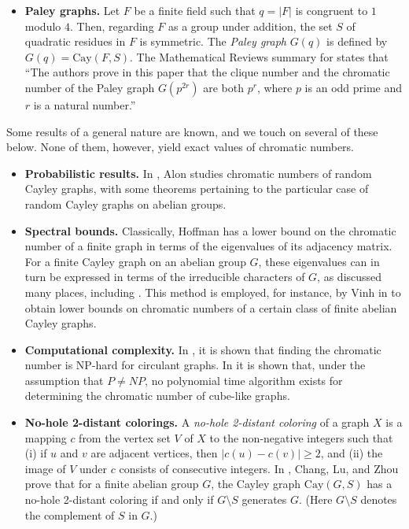 \documentclass{article}
\theoremstyle{definition}
\theoremstyle{remark}
\begin{document}
\begin{itemize}
\item \textbf{Paley graphs.} Let $F$ be a finite field such that $q=|F|$ is congruent to $1$ modulo $4$.  Then, regarding $F$ as a group under addition, the set $S$ of quadratic residues in $F$ is symmetric.  The \emph{Paley graph} $G(q)$ is defined by $G(q)=\text{Cay}(F,S)$.  The Mathematical Reviews summary for \cite{Broere-et-al} states that ``The authors prove in this paper that the clique number and the chromatic number of the Paley graph $G(p^{2r})$ are both $p^r$, where $p$ is an odd prime and $r$ is a natural number.''

\end{itemize}

Some results of a general nature are known, and we touch on several of these below.  None of them, however, yield exact values of chromatic numbers.

\begin{itemize}

\item \textbf{Probabilistic results.} In \cite{Alon}, Alon studies chromatic numbers of random Cayley graphs, with some theorems pertaining to the particular case of random Cayley graphs on abelian groups.

\item \textbf{Spectral bounds.} Classically, Hoffman \cite{Hoffman} has a lower bound on the chromatic number of a finite graph in terms of the eigenvalues of its adjacency matrix.  For a finite Cayley graph on an abelian group $G$, these eigenvalues can in turn be expressed in terms of the irreducible characters of $G$, as discussed many places, including \cite{Krebs-Shaheen}.  This method is employed, for instance, by Vinh in \cite{Vinh} to obtain lower bounds on chromatic numbers of a certain class of finite abelian Cayley graphs.

\item \textbf{Computational complexity.} In \cite{Codenotti-et-al}, it is shown that finding the chromatic number is NP-hard for circulant graphs.  In \cite{Godsil} it is shown that, under the assumption that $P\neq NP$, no polynomial time algorithm exists for determining the chromatic number of cube-like graphs.

\item \textbf{No-hole 2-distant colorings.} A {\it no-hole 2-distant coloring} of a graph $X$ is a mapping $c$ from the vertex set $V$ of $X$ to the non-negative integers such that (i) if $u$ and $v$ are adjacent vertices, then $|c(u)-c(v)|\geq 2$, and (ii) the image of $V$ under $c$ consists of consecutive integers.  In \cite{Chang}, Chang, Lu, and Zhou prove that for a finite abelian group $G$, the Cayley graph $\text{Cay}(G,S)$ has a no-hole 2-distant coloring if and only if $G\setminus S$ generates $G$.  (Here $G\setminus S$ denotes the complement of $S$ in $G$.)\end{itemize}
\end{document}
